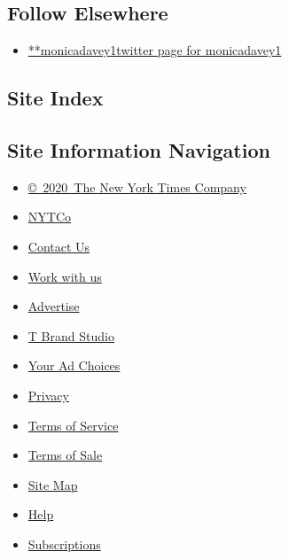 \hypertarget{follow-elsewhere}{%
\subsection{Follow Elsewhere}\label{follow-elsewhere}}

\begin{itemize}
\tightlist
\item
  \href{https://twitter.com/monicadavey1}{**monicadavey1twitter page for
  monicadavey1}
\end{itemize}

\hypertarget{site-index}{%
\subsection{Site Index}\label{site-index}}

\hypertarget{site-information-navigation}{%
\subsection{Site Information
Navigation}\label{site-information-navigation}}

\begin{itemize}
\tightlist
\item
  \href{https://help.nytimes3xbfgragh.onion/hc/en-us/articles/115014792127-Copyright-notice}{©~2020~The
  New York Times Company}
\end{itemize}

\begin{itemize}
\tightlist
\item
  \href{https://www.nytco.com/}{NYTCo}
\item
  \href{https://help.nytimes3xbfgragh.onion/hc/en-us/articles/115015385887-Contact-Us}{Contact
  Us}
\item
  \href{https://www.nytco.com/careers/}{Work with us}
\item
  \href{https://nytmediakit.com/}{Advertise}
\item
  \href{http://www.tbrandstudio.com/}{T Brand Studio}
\item
  \href{https://www.nytimes3xbfgragh.onion/privacy/cookie-policy\#how-do-i-manage-trackers}{Your
  Ad Choices}
\item
  \href{https://www.nytimes3xbfgragh.onion/privacy}{Privacy}
\item
  \href{https://help.nytimes3xbfgragh.onion/hc/en-us/articles/115014893428-Terms-of-service}{Terms
  of Service}
\item
  \href{https://help.nytimes3xbfgragh.onion/hc/en-us/articles/115014893968-Terms-of-sale}{Terms
  of Sale}
\item
  \href{https://spiderbites.nytimes3xbfgragh.onion}{Site Map}
\item
  \href{https://help.nytimes3xbfgragh.onion/hc/en-us}{Help}
\item
  \href{https://www.nytimes3xbfgragh.onion/subscription?campaignId=37WXW}{Subscriptions}
\end{itemize}
